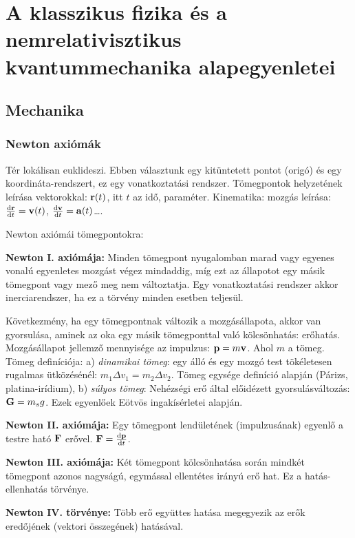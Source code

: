 \chapter{A klasszikus fizika \'es a nemrelativisztikus kvantummechanika alapegyenletei}\label{1tetel}
 
 \section{Mechanika}
  
  \subsection{Newton axiómák}
   
   Tér lokálisan euklideszi. Ebben választunk egy kitüntetett pontot (origó) és egy koordináta-rendszert, ez egy vonatkoztatási rendszer. Tömegpontok  helyzetének leírása vektorokkal: $\mathbf{r}(t)$, itt $t$ az idő, paraméter. Kinematika: mozgás leírása: $\frac{\mathrm{d}\mathbf{r}}{\mathrm{d} t}= \mathbf{v}(t)$, $\frac{\mathrm{d}\mathbf{v}}{\mathrm{d} t}= \mathbf{a}(t)$\dots. 
   
   Newton axiómái tömegpontokra:
   
   {\bf Newton I. axiómája:} Minden tömegpont nyugalomban marad vagy egyenes vonalú egyenletes mozgást végez mindaddig, míg ezt az állapotot egy másik tömegpont vagy mező meg nem változtatja. Egy vonatkoztatási rendszer akkor inerciarendszer, ha ez a törvény minden esetben teljesül.
   
   Következmény, ha egy tömegpontnak változik a mozgásállapota, akkor van gyorsulása, aminek az oka egy másik tömegponttal való kölcsönhatás: erőhatás. Mozgásállapot jellemző mennyisége az impulzus: $\mathbf{p}=m\mathbf{v}$. Ahol $m$ a tömeg. Tömeg definíciója: a) {\it dinamikai tömeg}: egy álló és egy mozgó test tökéletesen rugalmas ütközésénél: $m_1 \Delta v_1=m_2 \Delta v_2$. Tömeg egysége definíció alapján (Párizs, platina-irídium), b) {\it súlyos tömeg}: Nehézségi erő által előidézett gyorsulásváltozás: $\mathbf{G}=m_s g$. Ezek egyenlőek Eötvös ingakísérletei alapján.
   
   {\bf Newton II. axiómája:} Egy tömegpont lendületének (impulzusának) egyenlő a testre ható $\mathbf{F}$ erővel. $\mathbf{F}=\frac{\mathrm{d} \mathbf{p}}{\mathrm{d} t}$. 
   
   {\bf Newton III. axiómája:} Két tömegpont kölcsönhatása során mindkét tömegpont azonos nagyságú, egymással ellentétes irányú erő hat. Ez a hatás-ellenhatás törvénye. 
   
   {\bf Newton IV. törvénye:} Több erő együttes hatása megegyezik az erők eredőjének (vektori összegének) hatásával. 
   
